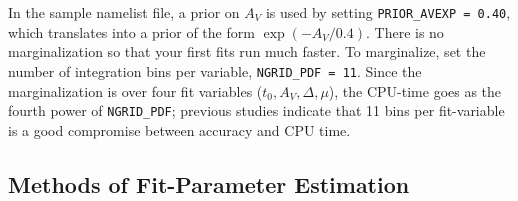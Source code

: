 \documentclass[12pt]{article}
\begin{document}
In the sample namelist file, a prior on $A_V$ is used by
setting {\tt PRIOR\_AVEXP = 0.40}, which translates into
a prior of the form $\exp(-A_V/0.4)$.
There is no marginalization so that your first fits run much faster.
To marginalize, set the number of integration bins per variable,
{\tt NGRID\_PDF~=~11}.
Since the marginalization is over four fit variables
($t_0,A_V,\Delta,\mu$),
the  CPU-time goes as the fourth power of {\tt NGRID\_PDF}; 
previous studies indicate that 11 bins per fit-variable 
is a good compromise between accuracy and CPU time.

   \subsection{Methods of Fit-Parameter Estimation}
   \label{subsec:param_eval}
\end{document}
